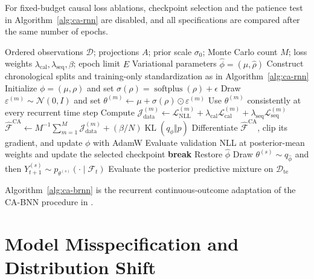 \documentclass[11pt]{article}
\newcommand{\F}{\mathcal{F}}
\newcommand{\D}{\mathcal{D}}
\newcommand{\N}{\mathcal{N}}
\newcommand{\KL}{\operatorname{KL}}
\newcommand{\CA}{\mathrm{CA}}
\begin{document}
For fixed-budget causal loss ablations, checkpoint selection and the patience test
in Algorithm~\ref{alg:ca-rnn} are disabled, and all specifications are compared
after the same number of epochs.

\begin{algorithm}[ht]
\caption{Variational calibration-aware Bayesian RNN training}
\label{alg:ca-brnn}
\begin{algorithmic}[1]
\Require Ordered observations $\D$; projections $A$; prior scale $\sigma_0$;
Monte Carlo count $M$; loss weights $\lambda_{\mathrm{cal}},
\lambda_{\mathrm{seq}},\beta$; epoch limit $E$
\Ensure Variational parameters $\widehat\phi=(\widehat\mu,\widehat\rho)$
\State Construct chronological splits and training-only standardization as in
Algorithm~\ref{alg:ca-rnn}
\State Initialize $\phi=(\mu,\rho)$ and set
$\sigma(\rho)=\operatorname{softplus}(\rho)+\epsilon$
    \For{consecutive mini-batch $B\subset\D_{\mathrm{tr}}$}
            \State Draw $\varepsilon^{(m)}\sim\N(0,I)$ and set
            $\theta^{(m)}\gets\mu+\sigma(\rho)\odot\varepsilon^{(m)}$
            \State Use $\theta^{(m)}$ consistently at every recurrent time step
            \State Compute $\mathcal J^{(m)}_{\mathrm{data}}\gets
            \mathcal L_{\mathrm{NLL}}^{(m)}+\lambda_{\mathrm{cal}}
            \mathcal L_{\mathrm{cal}}^{(m)}+\lambda_{\mathrm{seq}}
            \mathcal L_{\mathrm{seq}}^{(m)}$
        \EndFor
        \State $\widehat{\mathcal F}^{\CA}\gets M^{-1}\sum_{m=1}^M
        \mathcal J^{(m)}_{\mathrm{data}}+(\beta/N)\KL(q_\phi\Vert p)$
        \State Differentiate $\widehat{\mathcal F}^{\CA}$, clip its gradient,
        and update $\phi$ with AdamW
    \EndFor
    \State Evaluate validation NLL at posterior-mean weights and update the
    selected checkpoint
     \State \textbf{break} \EndIf
\EndFor
\State Restore $\widehat\phi$
    \State Draw $\theta^{(s)}\sim q_{\widehat\phi}$ and then
    $Y_{t+1}^{(s)}\sim p_{\theta^{(s)}}(\cdot\mid\F_t)$
\EndFor
\State Evaluate the posterior predictive mixture on $\D_{\mathrm{te}}$
\end{algorithmic}
\end{algorithm}

Algorithm~\ref{alg:ca-brnn} is the recurrent continuous-outcome adaptation of the
CA-BNN procedure in \cite{huang2024cabl}.

\section{Model Misspecification and Distribution Shift}
\end{document}
